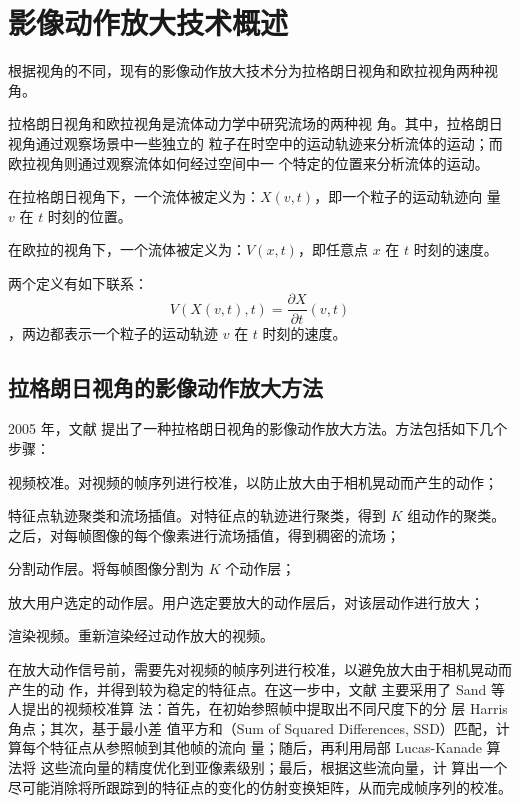 \chapter{影像动作放大技术概述}
\label{chap:previous}

根据视角的不同，现有的影像动作放大技术分为拉格朗日视角和欧拉视角两种视角。

拉格朗日视角和欧拉视角是流体动力学中研究流场的两种视
角。其中，拉格朗日视角通过观察场景中一些独立的
粒子在时空中的运动轨迹来分析流体的运动；而欧拉视角则通过观察流体如何经过空间中一
个特定的位置来分析流体的运动。

\begin{definition}[拉格朗日视角的流体]
  在拉格朗日视角下，一个流体被定义为：$X(v,t)$，即一个粒子的运动轨迹向
  量 $v$ 在 $t$ 时刻的位置。
\end{definition}

\begin{definition}[欧拉视角的流体]
  在欧拉的视角下，一个流体被定义为：$V(x,t)$，即任意点 $x$ 在 $t$ 时刻的速度。
\end{definition}

两个定义有如下联系：
$$V(X(v,t),t)=\frac{\partial X}{\partial t}(v, t)$$，两边都表示一个粒子的运动轨迹 $v$ 在 $t$ 时刻的速度。

\section{拉格朗日视角的影像动作放大方法}
\label{sec:lagriangian}

2005 年，文献 \cite{liu2005motion} 提出了一种拉格朗日视角的影像动作放大方法。方法包括如下几个步骤：

\begin{compactenum}
\item 视频校准。对视频的帧序列进行校准，以防止放大由于相机晃动而产生的动作；
\item 特征点轨迹聚类和流场插值。对特征点的轨迹进行聚类，得到 $K$ 组动作的聚类。
  之后，对每帧图像的每个像素进行流场插值，得到稠密的流场；
\item 分割动作层。将每帧图像分割为 $K$ 个动作层；
\item 放大用户选定的动作层。用户选定要放大的动作层后，对该层动作进行放大；
\item 渲染视频。重新渲染经过动作放大的视频。
\end{compactenum}

在放大动作信号前，需要先对视频的帧序列进行校准，以避免放大由于相机晃动而产生的动
作，并得到较为稳定的特征点。在这一步中，文献 \cite{liu2005motion} 主要采用了 Sand 等人提出的视频校准算
法：首先，在初始参照帧中提取出不同尺度下的分
层 Harris 角点；其次，基于最小差
值平方和（Sum of Squared Differences, SSD）匹配，计算每个特征点从参照帧到其他帧的流向
量；随后，再利用局部 Lucas-Kanade 算法将
这些流向量的精度优化到亚像素级别；最后，根据这些流向量，计
算出一个尽可能消除将所跟踪到的特征点的变化的仿射变换矩阵，从而完成帧序列的校准。

